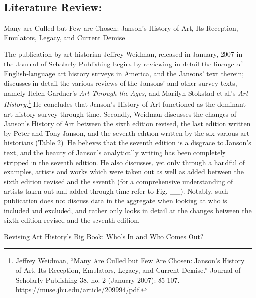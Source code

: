 \documentclass[
  letterpaper,
  DIV=11,
  numbers=noendperiod]{scrreprt}
\begin{document}
\hypertarget{literature-review-1}{%
\subsection{\texorpdfstring{\textbf{Literature
Review:}}{Literature Review:}}\label{literature-review-1}}

Many are Culled but Few are Chosen: Janson's History of Art, Its
Reception, Emulators, Legacy, and Current Demise

The publication by art historian Jeffrey Weidman, released in January,
2007 in the Journal of Scholarly Publishing begins by reviewing in
detail the lineage of English-language art history surveys in America,
and the Jansons' text therein; discusses in detail the various reviews
of the Jansons' and other survey texts, namely Helen Gardner's \emph{Art
Through the Ages}, and Marilyn Stokstad et al.'s \emph{Art
History.}\footnote{Jeffrey Weidman, ``Many Are Culled but Few Are
  Chosen: Janson's History of Art, Its Reception, Emulators, Legacy, and
  Current Demise.'' Journal of Scholarly Publishing 38, no. 2 (January
  2007): 85-107. https://muse.jhu.edu/article/209994/pdf.} He concludes
that Janson's History of Art functioned as the dominant art history
survey through time. Secondly, Weidman discusses the changes of Janson's
History of Art between the sixth edition revised, the last edition
written by Peter and Tony Janson, and the seventh edition written by the
six various art historians (Table 2). He believes that the seventh
edition is a disgrace to Janson's text, and the beauty of Janson's
analytically writing has been completely stripped in the seventh
edition. He also discusses, yet only through a handful of examples,
artists and works which were taken out as well as added between the
sixth edition revised and the seventh (for a comprehensive understanding
of artists taken out and added through time refer to Fig. \_\_).
Notably, such publication does not discuss data in the aggregate when
looking at who is included and excluded, and rather only looks in detail
at the changes between the sixth edition revised and the seventh
edition.

Revising Art History's Big Book: Who's In and Who Comes Out?
\end{document}

